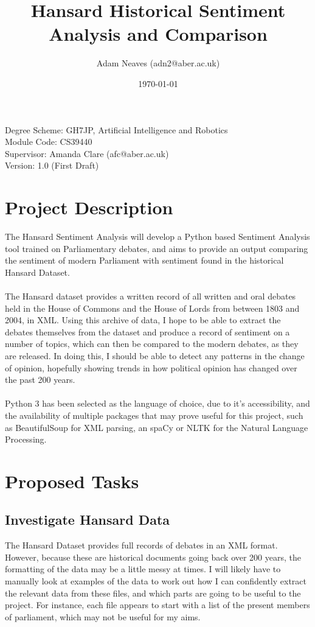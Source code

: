 \documentclass[draft]{article}
\author{Adam Neaves (adn2@aber.ac.uk)}
\title{Hansard Historical Sentiment Analysis and Comparison}
\date{\today}
\begin{document}
\maketitle
Degree Scheme: GH7JP, Artificial Intelligence and Robotics\\
Module Code: CS39440\\
Supervisor: Amanda Clare (afc@aber.ac.uk)\\
Version: 1.0 (First Draft)\\

\clearpage
\section{Project Description}
The Hansard  Sentiment Analysis will develop a Python based Sentiment Analysis tool trained on Parliamentary debates, and aims to provide an output comparing the sentiment of modern Parliament with sentiment found in the historical Hansard Dataset.
\\ \\
The Hansard dataset provides a written record of all written and oral debates held in the House of Commons and the House of Lords from between 1803 and 2004, in XML. Using this archive of data, I hope to be able to extract the debates themselves
from the dataset and produce a record of sentiment on a number of topics, which can then be compared to the modern debates, as they are released. In doing this, I should be able to detect any patterns in the change of opinion, hopefully showing trends
in how political opinion has changed over the past 200 years. 
\\ \\
Python 3 has been selected as the language of choice, due to it's accessibility, and the availability of multiple packages that may prove useful for this project, such as BeautifulSoup for XML parsing, an spaCy or NLTK for the Natural Language Processing.

\section{Proposed Tasks}
\subsection{Investigate Hansard Data}
The Hansard Dataset provides full records of debates in an XML format. However, because these are historical documents going back over 200 years, the formatting of the data may be a little messy at times. I will likely have to manually look at examples of the
data to work out how I can confidently extract the relevant data from these files, and which parts are going to be useful to the project. For instance, each file appears to start with a list of the present members of parliament, which may not be useful for my aims.
\end{document}
